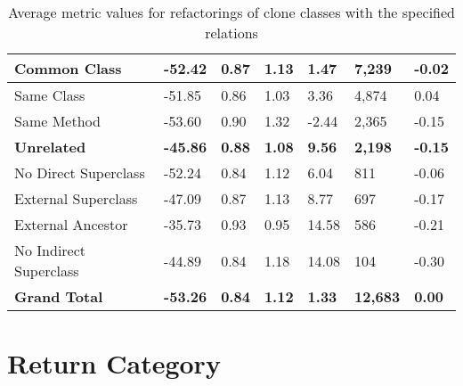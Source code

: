 \begin{appendices}
\begin{table}[H]
{\begin{tabular}{@{}lllllll@{}}
\textbf{Common Class} & \textbf{-52.42} & \textbf{0.87} & \textbf{1.13} & \textbf{1.47} & \textbf{7,239} & \textbf{-0.02} \\ \midrule
\hspace{10pt} Same Class & -51.85 & 0.86 & 1.03 & 3.36 & 4,874 & 0.04 \\
\hspace{10pt} Same Method & -53.60 & 0.90 & 1.32 & -2.44 & 2,365 & -0.15 \\ \midrule
\textbf{Unrelated} & \textbf{-45.86} & \textbf{0.88} & \textbf{1.08} & \textbf{9.56} & \textbf{2,198} & \textbf{-0.15} \\ \midrule
\hspace{10pt} No Direct Superclass & -52.24 & 0.84 & 1.12 & 6.04 & 811 & -0.06 \\
\hspace{10pt} External Superclass & -47.09 & 0.87 & 1.13 & 8.77 & 697 & -0.17 \\
\hspace{10pt} External Ancestor & -35.73 & 0.93 & 0.95 & 14.58 & 586 & -0.21 \\
\hspace{10pt} No Indirect Superclass & -44.89 & 0.84 & 1.18 & 14.08 & 104 & -0.30 \\ \midrule
\textbf{Grand Total} & \textbf{-53.26} & \textbf{0.84} & \textbf{1.12} & \textbf{1.33} & \textbf{12,683} & \textbf{0.00} \\ \bottomrule
\end{tabular}%
}
\caption{Average metric values for refactorings of clone classes with the specified relations}
\label{tab:full-relation}
\end{table}

\section{Return Category}
\begin{table}[H]
\centering
{}
\caption{Average metric values for refactorings of clone classes with the specified return category}
\label{tab:full-return}
\end{table}

\end{appendices}

